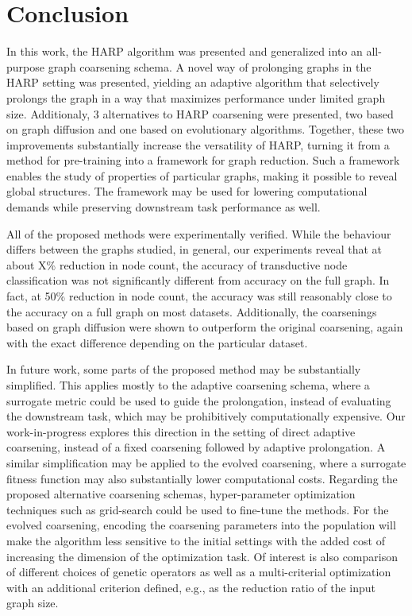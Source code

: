 \section{Conclusion}

In this work, the HARP algorithm was presented and generalized into an all-purpose graph coarsening schema. A novel way of prolonging graphs in the HARP setting was presented, yielding an adaptive algorithm that selectively prolongs the graph in a way that maximizes performance under limited graph size. Additionaly, 3 alternatives to HARP coarsening were presented, two based on graph diffusion and one based on evolutionary algorithms. Together, these two improvements substantially increase the versatility of HARP, turning it from a method for pre-training into a framework for graph reduction. Such a framework enables the study of properties of particular graphs, making it possible to reveal global structures. The framework may be used for lowering computational demands while preserving downstream task performance as well.

All of the proposed methods were experimentally verified. While the behaviour differs between the graphs studied, in general, our experiments reveal that at about X\% reduction in node count, the accuracy of transductive node classification was not significantly different from accuracy on the full graph. In fact, at 50\% reduction in node count, the accuracy was still reasonably close to the accuracy on a full graph on most datasets. Additionally, the coarsenings based on graph diffusion were shown to outperform the original coarsening, again with the exact difference depending on the particular dataset.

In future work, some parts of the proposed method may be substantially simplified. This applies mostly to the adaptive coarsening schema, where a surrogate metric could be used to guide the prolongation, instead of evaluating the downstream task, which may be prohibitively computationally expensive. Our work-in-progress \cite{prochazka_downstream_2022} explores this direction in the setting of direct adaptive coarsening, instead of a fixed coarsening followed by adaptive prolongation. A similar simplification may be applied to the evolved coarsening, where a surrogate fitness function may also substantially lower computational costs. Regarding the proposed alternative coarsening schemas, hyper-parameter optimization techniques such as grid-search could be used to fine-tune the methods. For the evolved coarsening, encoding the coarsening parameters into the population will make the algorithm less sensitive to the initial settings with the added cost of increasing the dimension of the optimization task. Of interest is also comparison of different choices of genetic operators as well as a multi-criterial optimization with an additional criterion defined, e.g., as the reduction ratio of the input graph size.

